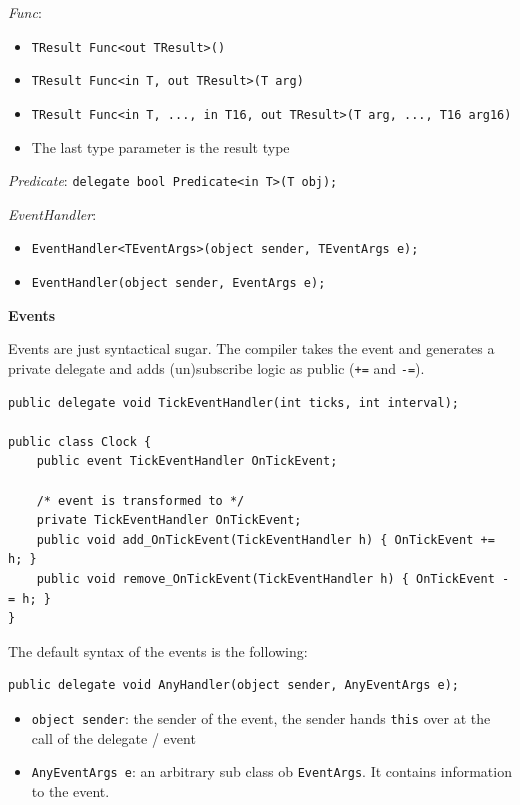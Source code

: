 \documentclass[11pt,twoside,landscape]{article}
\begin{document}
\begin{multicols}{3}
\emph{Func}:
\begin{itemize}
\item \texttt{TResult Func<out TResult>()}
\item \texttt{TResult Func<in T, out TResult>(T arg)}
\item \texttt{TResult Func<in T, ..., in T16, out TResult>(T arg, ..., T16 arg16)}
\item The last type parameter is the result type
\end{itemize}

\emph{Predicate}:
\texttt{delegate bool Predicate<in T>(T obj);}

\emph{EventHandler}:
\begin{itemize}
\item \texttt{EventHandler<TEventArgs>(object sender, TEventArgs e);}
\item \texttt{EventHandler(object sender, EventArgs e);}
\end{itemize}


\textbf{Events}

Events are just syntactical sugar.
The compiler takes the event and generates a private delegate and adds (un)subscribe logic as public (\texttt{+=} and \texttt{-=}).
\lstset{language=csharp,label= ,caption= ,captionpos=b,numbers=none}
\begin{lstlisting}
public delegate void TickEventHandler(int ticks, int interval);

public class Clock {
    public event TickEventHandler OnTickEvent;

    /* event is transformed to */
    private TickEventHandler OnTickEvent;
    public void add_OnTickEvent(TickEventHandler h) { OnTickEvent += h; }
    public void remove_OnTickEvent(TickEventHandler h) { OnTickEvent -= h; }
}
\end{lstlisting}


The default syntax of the events is the following:
\lstset{language=csharp,label= ,caption= ,captionpos=b,numbers=none}
\begin{lstlisting}
public delegate void AnyHandler(object sender, AnyEventArgs e);
\end{lstlisting}

\begin{itemize}
\item \texttt{object sender}: the sender of the event, the sender hands \texttt{this} over at the call of the delegate / event
\item \texttt{AnyEventArgs e}: an arbitrary sub class ob \texttt{EventArgs}. It contains information to the event.
\end{itemize}



\end{multicols}
\end{document}
